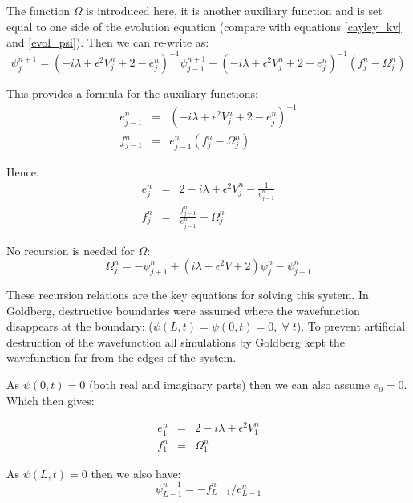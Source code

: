 \noindent The function $\Omega$ is introduced here, it is another auxiliary function and is set equal to one side of the evolution equation (compare with equations \ref{cayley_kv} and \ref{evol_psi}). Then we can re-write as:
\begin{equation}
\psi_{j}^{n+1} = (-i\lambda +\epsilon^2 V_{j}^{n} +2 -e^n_j)^{-1} \psi_{j-1}^{n+1} +  (-i\lambda +\epsilon^2 V_{j}^{n} +2 -e^n_j)^{-1} (f_j^n - \Omega_j^n)
\end{equation}

\noindent This provides a formula for the auxiliary functions:
\begin{eqnarray}
e_{j-1}^n &=& (-i\lambda +\epsilon^2 V_{j}^{n} +2 -e^n_j)^{-1} \nonumber \\
f_{j-1}^n &=& e_{j-1}^n (f_j^n - \Omega_j^n)
\end{eqnarray}

\noindent Hence:
\begin{eqnarray}
e_{j}^n &=& 2 -i\lambda +\epsilon^2 V_{j}^{n} - \frac{1}{e_{j-1}^n} \nonumber \\
f_{j}^n &=& \frac{f_{j-1}^n}{e_{j-1}^n} + \Omega_j^n
\end{eqnarray}

\noindent No recursion is needed for $\Omega$:
\begin{equation}
\label{g_omega}
\Omega_j^n = -\psi_{j+1}^{n} + (i\lambda + \epsilon^2 V +2)\psi_{j}^{n} -\psi_{j-1}^{n}
\end{equation}

\noindent These recursion relations are the key equations for solving this system. In Goldberg, destructive boundaries were assumed where the wavefunction disappears at the boundary: ($\psi(L,t) = \psi(0,t) = 0, \; \forall \; t$). To prevent artificial destruction of the wavefunction all simulations by Goldberg kept the wavefunction far from the edges of the system.

As $\psi(0,t) = 0$ (both real and imaginary parts) then we can also assume $e_0 = 0$. Which then gives:

\begin{eqnarray}
e_{1}^n &=& 2 -i\lambda +\epsilon^2 V_{1}^{n} \nonumber \\
f_{1}^n &=& \Omega_1^n
\end{eqnarray}

\noindent As $\psi(L,t) = 0$ then we also have:
\begin{equation}
\psi_{L-1}^{n+1} = -f_{L-1}^n/e_{L-1}^n
\end{equation}


